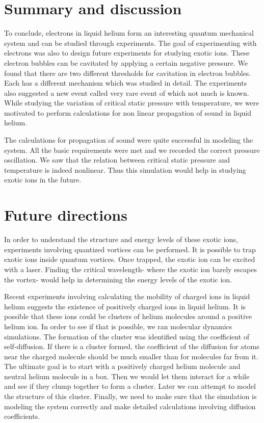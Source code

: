 \section{Summary and discussion}

To conclude, electrons in liquid helium form an interesting quantum mechanical system and can be studied through experiments. The goal of experimenting with electrons was also to design future experiments for studying exotic ions. These electron bubbles can be cavitated by applying a certain negative pressure. We found that there are two different thresholds for cavitation in electron bubbles. Each has a different mechanism which was studied in detail. The experiments also suggested a new event called very rare event of which not much is known. While studying the variation of critical static pressure with temperature, we were motivated to perform calculations for non linear propagation of sound in liquid helium.

The calculations for propagation of sound were quite successful in modeling the system. All the basic requirements were met and we recorded the correct pressure oscillation. We saw that the relation between critical static pressure and temperature is indeed nonlinear. Thus this simulation would help in studying exotic ions in the future.


\section{Future directions}
In order to understand the structure and energy levels of these exotic ions, experiments involving quantized vortices can be performed. It is possible to trap exotic ions inside quantum vortices. \cite{Milliken1982} Once trapped, the exotic ion can be excited with a laser. \cite{DEGROOT1985445} Finding the critical wavelength- where the exotic ion barely escapes the vortex- would help in determining the energy levels of the exotic ion.

Recent experiments involving calculating the mobility of charged ions in liquid helium suggests the existence of positively charged ions in liquid helium. It is possible that these ions could be clusters of helium molecules around a positive helium ion. In order to see if that is possible, we ran molecular dynamics simulations. The formation of the cluster was identified using the coefficient of self-diffusion. If there is a cluster formed, the coefficient of the diffusion for atoms near the charged molecule should be much smaller than for molecules far from it. The ultimate goal is to start with a positively charged helium molecule and neutral helium molecule in a box. Then we would let them interact for a while and see if they clump together to form a cluster. Later we can attempt to model the structure of this cluster. Finally, we need to make sure that the simulation is modeling the system correctly and make detailed calculations involving diffusion coefficients.

